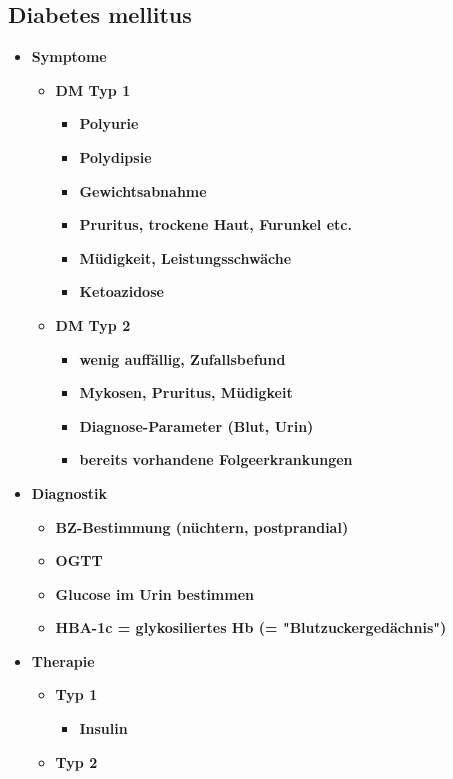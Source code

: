 	\subsection{Diabetes mellitus}
	\begin{itemize}
		\item \textbf{Symptome}
			\begin{itemize}
				\item \textbf{DM Typ 1}
					\begin{itemize}
						\item \textbf{Polyurie}
						\item \textbf{Polydipsie}
						\item \textbf{Gewichtsabnahme}
						\item \textbf{Pruritus, trockene Haut, Furunkel etc.}
						\item \textbf{Müdigkeit, Leistungsschwäche}
						\item \textbf{Ketoazidose}
					\end{itemize}		
				\item \textbf{DM Typ 2}
					\begin{itemize}
						\item \textbf{wenig auffällig, Zufallsbefund}
						\item \textbf{Mykosen, Pruritus, Müdigkeit}
						\item \textbf{Diagnose-Parameter (Blut, Urin)}
						\item \textbf{bereits vorhandene Folgeerkrankungen}
					\end{itemize}
			\end{itemize}
	\pagebreak
		\item \textbf{Diagnostik}
			\begin{itemize}
				\item \textbf{BZ-Bestimmung (nüchtern, postprandial)}
				\item \textbf{OGTT}
				\item \textbf{Glucose im Urin bestimmen}
				\item \textbf{HBA-1c = glykosiliertes Hb (= "Blutzuckergedächnis")}
			\end{itemize}
		\item \textbf{Therapie}
			\begin{itemize}
				\item \textbf{Typ 1}
					\begin{itemize}
						\item \textbf{Insulin}
					\end{itemize}
				\item \textbf{Typ 2}

\end{itemize}
\end{itemize}
